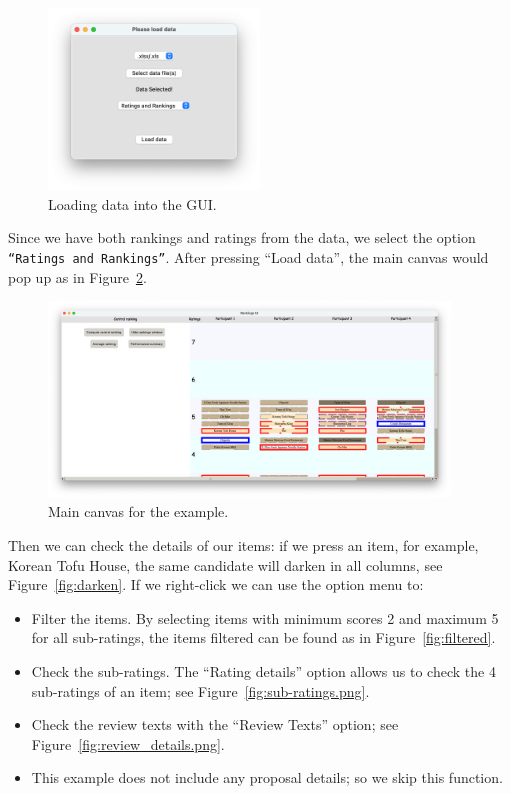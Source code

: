 \documentclass[a4paper,11pt]{memoir}
\begin{document}
  \begin{figure}[h]
    \begin{center}
      \includegraphics[width=0.5\textwidth]{art/example_1.png}
      \caption{Loading data into the GUI.}\label{fig:example1}
    \end{center}
  \end{figure}

Since we have both rankings and ratings from the data, we select the option \texttt{``Ratings and Rankings''}. 
After pressing ``Load data'', 
the main canvas would pop up as in Figure~\ref{fig:example2}.

  \begin{figure}[h]
    \begin{center}
      \includegraphics[width=0.95\textwidth]{art/example_2.png}
      \caption{Main canvas for the example.}\label{fig:example2}
    \end{center}
  \end{figure}


Then we can check the details of our items:
if we press an item, for example, Korean Tofu House,
the same candidate will darken in all columns,
see Figure~\ref{fig:darken}. 
If we right-click we can use the option menu to:
\begin{itemize}
  \item Filter the items. By selecting items with minimum scores 2 and maximum 5 for all sub-ratings, the items filtered can be found as in Figure~\ref{fig:filtered}.
  \item Check the sub-ratings. The ``Rating details'' option allows us to check the 4 sub-ratings of an item; see Figure~\ref{fig:sub-ratings.png}.
  \item Check the review texts with the ``Review Texts'' option; see Figure~\ref{fig:review_details.png}.
  \item This example does not include any proposal details; so we skip this function.
\end{itemize}
\end{document}
